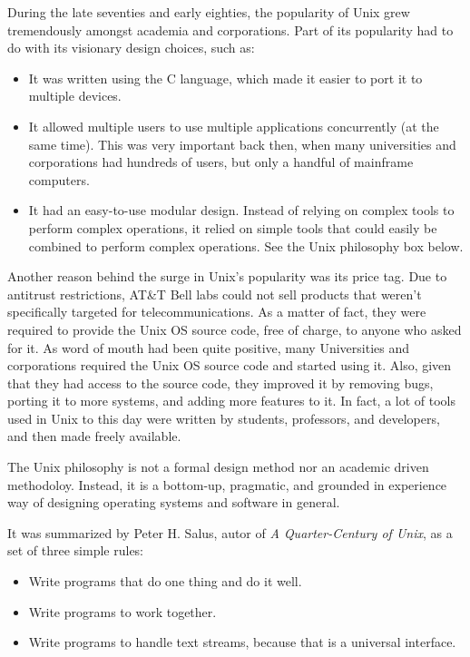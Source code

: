 During the late seventies and early eighties, the popularity of Unix grew tremendously amongst academia and corporations. Part of its popularity had to do with its visionary design choices, such as:
\begin{itemize}
\item It was written using the C language, which made it easier to port it to multiple devices.
\item It allowed multiple users to use multiple applications concurrently (at the same time). This was very important back then, when many universities and corporations had hundreds of users, but only a handful of mainframe computers.
\item It had an easy-to-use modular design. Instead of relying on complex tools to perform complex operations, it relied on simple tools that could easily be combined to perform complex operations. See the Unix philosophy box below.
\end{itemize}
Another reason behind the surge in Unix's popularity was its price tag. Due to antitrust restrictions, AT\&T Bell labs could not sell products that weren't specifically targeted for telecommunications. As a matter of fact, they were required to provide the Unix \acs{OS} source code, free of charge, to anyone who asked for it. As word of mouth had been quite positive, many Universities and corporations required the Unix \acs{OS} source code and started using it. Also, given that they had access to the source code, they improved it by removing bugs, porting it to more systems, and adding more features to it. In fact, a lot of tools used in Unix to this day were written by students, professors, and developers, and then made freely available.

\vspace{0.5cm}
\begin{my_box}
The Unix philosophy is not a formal design method nor an academic driven methodoloy. Instead, it is a bottom-up, pragmatic, and grounded in experience way of designing operating systems and software in general.

It was summarized by Peter H. Salus, autor of \textit{A Quarter-Century of Unix}, as a set of three simple rules:
\begin{itemize}
\item Write programs that do one thing and do it well.
\item Write programs to work together.
\item Write programs to handle text streams, because that is a universal interface.
\end{itemize}
\label{box:philosophy}
\end{my_box}

